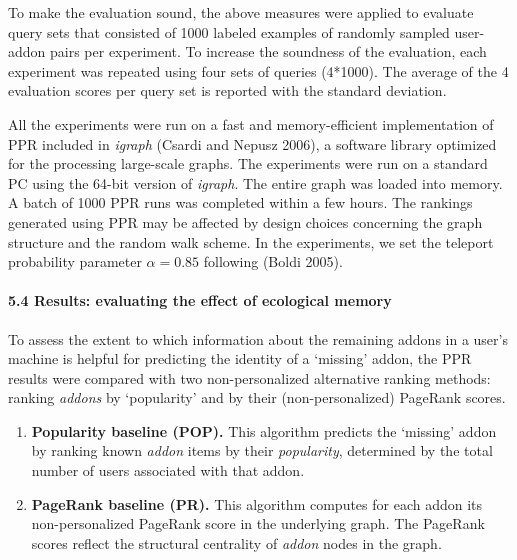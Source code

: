 \documentclass{article} %
\begin{document}
 To make the evaluation sound, the above measures were applied to evaluate query sets that consisted of 1000 labeled examples of randomly sampled user-addon pairs per experiment. To increase the soundness of the evaluation, each experiment was repeated using four sets of queries (4*1000). The average of the 4 evaluation scores per query set is reported with the standard deviation.



All the experiments were run on a fast and memory-efficient implementation of PPR included in\textit{ igraph} (Csardi and Nepusz 2006), a software library optimized for the processing large-scale graphs. The experiments were run on a standard PC using the 64-bit version of \textit{igraph}. The entire graph was loaded into memory. A batch of 1000 PPR runs was completed within a few hours. The rankings generated using PPR may be affected by design choices concerning the graph structure and the random walk scheme. In the experiments, we set the teleport probability parameter $\alpha \mathrm{=0.85}$ following (Boldi 2005). 



\noindent 


\paragraph{5.4  Results: evaluating the effect of ecological memory}

 

To assess the extent to which information about the remaining addons in a user's machine is helpful for predicting the identity of a `missing' addon, the PPR results were compared with two non-personalized alternative ranking methods: ranking \textit{addons} by `popularity' and by their (non-personalized) PageRank scores.



\begin{enumerate}
\item  \textbf{Popularity baseline (POP). }This algorithm predicts the `missing' addon by ranking known \textit{addon} items by their \textit{popularity}, determined by the total number of users associated with that addon. 

\item  \textbf{PageRank baseline (PR). }This algorithm computes for each addon its non-personalized PageRank score in the underlying graph. The PageRank scores reflect the structural centrality of \textit{addon} nodes in the graph.
\end{enumerate}
\end{document}
